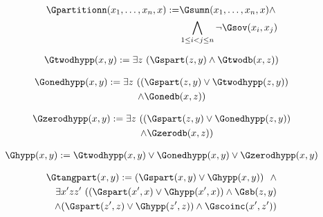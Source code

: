 \begin{erin}
    \begin{align*}
        \Gpartitionn(x_{1},\ldots,x_{n},x) := &\Gsumn(x_{1},\ldots,x_{n},x) \wedge\\ &\bigwedge_{1 \leq i < j \leq n} \neg\Gsov(x_i,x_j)
    \end{align*}
\end{erin}

\begin{erin}
    \begin{align*}
        \Gtwodhypp(x,y) := \exists z\ (\Gspart(z,y) \wedge \Gtwodb(x,z))
    \end{align*}
\end{erin}

\begin{erin}
    \begin{align*}
        \Gonedhypp(x,y) := \exists z\ ((&\Gspart(z,y) \vee \Gtwodhypp(z,y))\\
        \wedge  &\Gonedb(x,z))
    \end{align*}
\end{erin}

\begin{erin}
    \begin{align*}
        \Gzerodhypp(x,y) := \exists z\ ((&\Gspart(z,y) \vee \Gonedhypp(z,y))\\ 
        \wedge  &\Gzerodb(x,z))
    \end{align*}
\end{erin}
               
\begin{erin}
    \begin{align*}
        \Ghypp(x,y) := \Gtwodhypp(x,y) \vee \Gonedhypp(x,y) \vee \Gzerodhypp(x,y)
    \end{align*}
\end{erin}

\begin{erin}
    \begin{align*}
        \Gtangpart(x,y) := (\Gspart(x,y) \vee \Ghypp(x,y))\ \ \wedge\\
        \exists x'zz'\ ((\Gspart(x',x) \vee \Ghypp(x',x)) \wedge 
        \Gsb(z,y) \\
        \wedge (\Gspart(z',z) \vee \Ghypp(z',z)) \wedge \Gscoinc(x',z'))
    \end{align*}
\end{erin}

